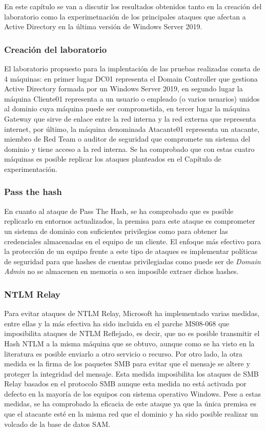 En este capítulo se van a discutir los resultados obtenidos tanto en la creación del laboratorio como la experimetnación de los principales ataques que afectan a Active Directory en la última versión de Windows Server 2019.

\subsubsection{Creación del laboratorio}
El laboratorio propuesto para la implentación de las pruebas realizadas consta de 4 máquinas: en primer lugar DC01 representa el Domain Controller que gestiona Active Directory formada por un Windows Server 2019, en segundo lugar la máquina Cliente01 representa a un usuario o empleado (o varios usuarios) unidos al dominio cuya máquina puede ser comprometida, en tercer lugar la máquina Gateway que sirve de enlace entre la red interna y la red externa que representa internet, por último, la máquina denominada Atacante01 representa un atacante, miembro de Red Team o auditor de seguridad que compromete un sistema del dominio y tiene acceso a la red interna. Se ha comprobado que con estas cuatro máquinas es posible replicar los ataques planteados en el Capítulo de experimentación. 
\subsubsection{Pass the hash}
En cuanto al ataque de Pass The Hash, se ha comprobado que es posible replicarlo en entornos actualizados, la premisa para este ataque es comprometer un sistema de dominio con suficientes privilegios como para obtener las credenciales almacenadas en el equipo de un cliente. El enfoque más efectivo para la protección de un equipo frente a este tipo de ataques es implementar políticas de seguridad para que hashes de cuentas privilegiadas como puede ser de {\it Domain Admin} no se almacenen en memoria o sea imposible extraer dichos hashes.
\subsubsection{NTLM Relay}
Para evitar ataques de NTLM Relay, Microsoft ha implementado varias medidas, entre ellas y la más efectiva ha sido incluida en el parche MS08-068 que imposibilita ataques de NTLM Reflejado, es decir, que no es posible transmitir el Hash NTLM a la misma máquina que se obtuvo, aunque como se ha visto en la literatura es posible enviarlo a otro servicio o recurso. Por otro lado, la otra medida es la firma de los paquetes SMB para evitar que el mensaje se altere y proteger la integridad del mensaje. Esta medida imposibilita los ataques de SMB Relay basados en el protocolo SMB aunque esta medida no está activada por defecto en la mayoría de los equipos con sistema operativo Windows. Pese a estas medidas, se ha comprobado la eficacia de este ataque ya que la única premisa es que el atacante esté en la misma red que el dominio y ha sido posible realizar un volcado de la base de datos SAM. 
